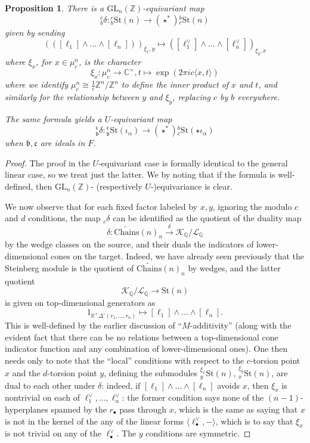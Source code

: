 \documentclass[10pt]{amsart}
\newtheorem{prop}[thm]{Proposition}
\theoremstyle{definition}
\newcommand{\Z}{\mathbb{Z}}
\newcommand{\Q}{\mathbb{Q}}
\newcommand{\C}{\mathbb{C}}
\newcommand{\R}{\mathbb{R}}
\renewcommand{\c}{\mathfrak{c}}
\renewcommand{\b}{\mathfrak{b}}
\newcommand{\St}{\mathrm{St}}
\newcommand{\Chains}{\mathrm{Chains}}
\newcommand{\GL}{\mathrm{GL}}
\numberwithin{equation}{section}
\begin{document}
    \begin{prop} \label{prop:c-conicalduality}
        There is a $\GL_n(\Z)$-equivariant map
        \[
        {}^c_b\delta: {}_b^c\St(n) \to (\star^*){}^b_c\St(n)
        \]
        given by sending 
        \[
        (([\ell_1] \wedge \ldots \wedge [\ell_n]))_{\xi_x,y} \mapsto ([\ell_1^\vee] \wedge \ldots \wedge [\ell_n^\vee])_{\xi_y,x}
        \]
        where $\xi_x$, for $x\in \mu_c^n$, is the character
        \[
        \xi_x:\mu_c^n \to \C^\times ,t\mapsto \exp(2\pi ic\langle x, t\rangle)
        \]
        where we identify $\mu_c^n \cong \frac{1}{c}\Z^n/\Z^n$ to define the inner product of $x$ and $t$, and similarly for the relationship between $y$ and $\xi_y$, replacing $c$ by $b$ everywhere. 
        
        The same formula yields a $U$-equivariant map 
        \[
        {}^\c_\b\delta: {}_\b^\c\St(\iota_\alpha) \to (\star^*){}^b_c\St(\star \iota_\alpha)
        \]
        when $\b,\c$ are ideals in $F$. 
    \end{prop}
    \begin{proof}
        The proof in the $U$-equivariant case is formally identical to the general linear case, so we treat just the latter. We by noting that if the formula is well-defined, then $\GL_n(\Z)$- (respectively $U$-)equivariance is clear. 
        
        We now observe that for each fixed factor labeled by $x,y$, ignoring the modulo $c$ and $d$ conditions, the map ${}_c\delta$ can be identified as the quotient of the duality map
        \[
        \delta: \widetilde{\Chains}(n)_n \xrightarrow{\delta} \mathcal{K}_\Q/\mathcal{L}_\Q
        \]
        by the wedge classes on the source, and their duals the indicators of lower-dimensional cones on the target. Indeed, we have already seen previously that the Steinberg module is the quotient of $\widetilde{\Chains}(n)_n$ by wedges, and the latter quotient
        \[
        \mathcal{K}_\Q/\mathcal{L}_\Q \to \St(n)
        \]
        is given on top-dimensional generators as
        \[
        1_{\R^+\Delta^\circ(r_1,\ldots, r_n)}\mapsto [\ell_1] \wedge \ldots \wedge [\ell_n].\]
        This is well-defined by the earlier discussion of ``$M$-additivity'' (along with the evident fact that there can be no relations between a top-dimensional cone indicator function and any combination of lower-dimensional ones). One then needs only to note that the ``local'' conditions with respect to the $c$-torsion point $x$ and the $d$-torsion point $y$, defining the submodules ${}^{\xi_x}_y\St(n)$, ${}^{\xi_y}_x\St(n)$, are dual to each other under $\delta$: indeed, if $[\ell_1]\wedge \ldots \wedge [\ell_n]$ avoids $x$, then $\xi_x$ is nontrivial on each of $\ell_1^\vee,\ldots, \ell_n^\vee$: the former condition says none of the $(n-1)$-hyperplanes spanned by the $r_\bullet$ pass through $x$, which is the same as saying that $x$ is not in the kernel of the any of the linear forms $\langle \ell_\bullet^\vee, -\rangle$, which is to say that $\xi_x$ is not trivial on any of the $\ell_\bullet^\vee$. The $y$ conditions are symmetric.
    \end{proof}
\end{document}
